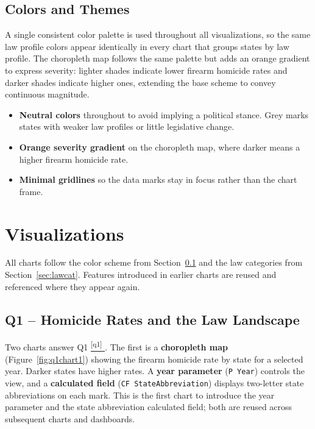 \documentclass[a4paper,11pt]{article}
\newcommand*{\sref}[1]{%
  \hyperref[{#1}]{%
    \color{accent}\textsuperscript{\ref*{#1}}%
  }%
}
\begin{document}
\subsection{Colors and Themes}\label{colors}

\par
A single consistent color palette is used throughout all visualizations, so the
same law profile colors appear identically in every chart that groups states
by law profile. The choropleth map follows the same palette but adds an
orange gradient to express severity: lighter shades indicate lower firearm
homicide rates and darker shades indicate higher ones, extending the base
scheme to convey continuous magnitude.

\begin{itemize}
	\item \textbf{Neutral colors} throughout to avoid implying a political stance.
	      Grey marks states with weaker law profiles or little legislative change.
	\item \textbf{Orange severity gradient} on the choropleth map, where darker
	      means a higher firearm homicide rate.
	\item \textbf{Minimal gridlines} so the data marks stay in focus rather than
	      the chart frame.
\end{itemize}

\section{Visualizations}

\par
All charts follow the color scheme from Section~\ref{colors} and the law
categories from Section~\ref{sec:lawcat}. Features introduced in earlier
charts are reused and referenced where they appear again.

\newpage
\subsection{Q1 -- Homicide Rates and the Law Landscape}\label{sec:viz:q1}

\par
Two charts answer Q1\sref{q1}. The first is a \textbf{choropleth map}
(Figure~\ref{fig:q1chart1}) showing the firearm homicide rate by state for a
selected year. Darker states have higher rates. A \textbf{year parameter}
(\texttt{P Year}) controls the view, and a \textbf{calculated field}
(\texttt{CF StateAbbreviation}) displays two-letter state abbreviations on
each mark. This is the first chart to introduce the year parameter and the
state abbreviation calculated field; both are reused across subsequent charts
and dashboards.
\end{document}
